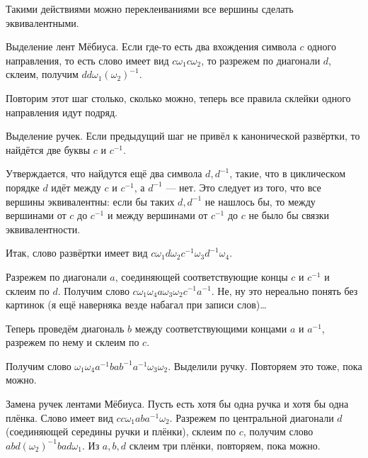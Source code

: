 \documentclass[a4paper]{report}
\begin{document}
{{{                Такими действиями можно переклеиваниями все вершины сделать эквивалентными.
                \item Выделение лент Мёбиуса.
                Если где-то есть два вхождения символа $c$ одного направления, то есть слово имеет вид $c \omega_1 c \omega_2$, то разрежем по диагонали $d$, склеим, получим $d d \omega_1 (\omega_2)^{-1}$.

                Повторим этот шаг столько, сколько можно, теперь все правила склейки одного направления идут подряд.

                \item Выделение ручек. Если предыдущий шаг не привёл к канонической развёртки, то найдётся две буквы $c$ и $c^{-1}$.

                Утверждается, что найдутся ещё два символа $d, d^{-1}$, такие, что в циклическом порядке $d$ идёт между $c$ и $c^{-1}$, а $d^{-1}$ --- нет.
                Это следует из того, что все вершины эквивалентны: если бы таких $d, d^{-1}$ не нашлось бы, то между вершинами от $c$ до $c^{-1}$ и между вершинами от $c^{-1}$ до $c$ не было бы связки эквивалентности.

                Итак, слово развёртки имеет вид $c \omega_1 d \omega_2 c^{-1} \omega_3 d^{-1} \omega_4$.

                Разрежем по диагонали $a$, соединяющей соответствующие концы $c$ и $c^{-1}$ и склеим по $d$.
                Получим слово $c \omega_1 \omega_4 a \omega_3 \omega_2 c^{-1} a^{-1}$.
                Не, ну это нереально понять без картинок (я ещё наверняка везде набагал при записи слов)\ldots

                Теперь проведём диагональ $b$ между соответствующими концами $a$ и $a^{-1}$, разрежем по нему и склеим по $c$.

                Получим слово  $\omega_1 \omega_4 a^{-1} b a b^{-1} a^{-1} \omega_3 \omega_2$.
                Выделили ручку. Повторяем это тоже, пока можно.
                \item Замена ручек лентами Мёбиуса.
                Пусть есть хотя бы одна ручка и хотя бы одна плёнка. Слово имеет вид $c c \omega_1 a b a^{-1} \omega_2$.
                Разрежем по центральной диагонали $d$ (соединяющей середины ручки и плёнки), склеим по $c$, получим слово $abd (\omega_2)^{-1} b a d \omega_1$.
                Из $a, b, d$ склеим три плёнки, повторяем, пока можно.
            }
        }
    }
\end{document}
